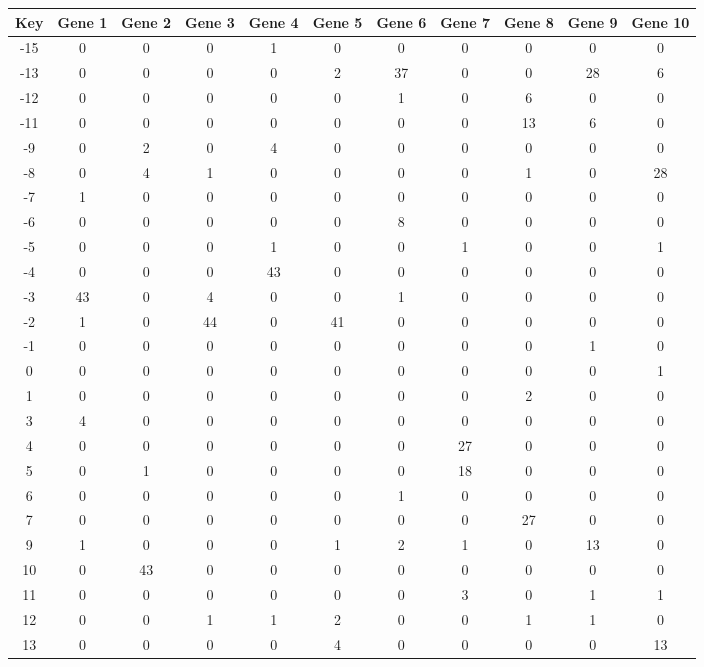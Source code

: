 \begin{tabular}{|c|c|c|c|c|c|c|c|c|c|c|}
\hline
Key & Gene 1 & Gene 2 & Gene 3 & Gene 4 & Gene 5 & Gene 6 & Gene 7 & Gene 8 & Gene 9 & Gene 10 \\
\hline
-15 & 0 & 0 & 0 & 1 & 0 & 0 & 0 & 0 & 0 & 0 \\
-13 & 0 & 0 & 0 & 0 & 2 & 37 & 0 & 0 & 28 & 6 \\
-12 & 0 & 0 & 0 & 0 & 0 & 1 & 0 & 6 & 0 & 0 \\
-11 & 0 & 0 & 0 & 0 & 0 & 0 & 0 & 13 & 6 & 0 \\
-9 & 0 & 2 & 0 & 4 & 0 & 0 & 0 & 0 & 0 & 0 \\
-8 & 0 & 4 & 1 & 0 & 0 & 0 & 0 & 1 & 0 & 28 \\
-7 & 1 & 0 & 0 & 0 & 0 & 0 & 0 & 0 & 0 & 0 \\
-6 & 0 & 0 & 0 & 0 & 0 & 8 & 0 & 0 & 0 & 0 \\
-5 & 0 & 0 & 0 & 1 & 0 & 0 & 1 & 0 & 0 & 1 \\
-4 & 0 & 0 & 0 & 43 & 0 & 0 & 0 & 0 & 0 & 0 \\
-3 & 43 & 0 & 4 & 0 & 0 & 1 & 0 & 0 & 0 & 0 \\
-2 & 1 & 0 & 44 & 0 & 41 & 0 & 0 & 0 & 0 & 0 \\
-1 & 0 & 0 & 0 & 0 & 0 & 0 & 0 & 0 & 1 & 0 \\
0 & 0 & 0 & 0 & 0 & 0 & 0 & 0 & 0 & 0 & 1 \\
1 & 0 & 0 & 0 & 0 & 0 & 0 & 0 & 2 & 0 & 0 \\
3 & 4 & 0 & 0 & 0 & 0 & 0 & 0 & 0 & 0 & 0 \\
4 & 0 & 0 & 0 & 0 & 0 & 0 & 27 & 0 & 0 & 0 \\
5 & 0 & 1 & 0 & 0 & 0 & 0 & 18 & 0 & 0 & 0 \\
6 & 0 & 0 & 0 & 0 & 0 & 1 & 0 & 0 & 0 & 0 \\
7 & 0 & 0 & 0 & 0 & 0 & 0 & 0 & 27 & 0 & 0 \\
9 & 1 & 0 & 0 & 0 & 1 & 2 & 1 & 0 & 13 & 0 \\
10 & 0 & 43 & 0 & 0 & 0 & 0 & 0 & 0 & 0 & 0 \\
11 & 0 & 0 & 0 & 0 & 0 & 0 & 3 & 0 & 1 & 1 \\
12 & 0 & 0 & 1 & 1 & 2 & 0 & 0 & 1 & 1 & 0 \\
13 & 0 & 0 & 0 & 0 & 4 & 0 & 0 & 0 & 0 & 13 \\
\hline
\end{tabular}